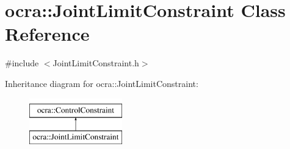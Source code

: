\hypertarget{classocra_1_1JointLimitConstraint}{}\section{ocra\+:\+:Joint\+Limit\+Constraint Class Reference}
\label{classocra_1_1JointLimitConstraint}


{\ttfamily \#include $<$Joint\+Limit\+Constraint.\+h$>$}

Inheritance diagram for ocra\+:\+:Joint\+Limit\+Constraint\+:\begin{figure}[H]
\begin{center}
\leavevmode
\includegraphics[height=2.000000cm]{d4/d69/classocra_1_1JointLimitConstraint}
\end{center}
\end{figure}
